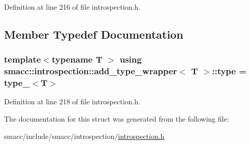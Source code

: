 Definition at line 216 of file introspection.\+h.



\subsection{Member Typedef Documentation}
\subsubsection[{\texorpdfstring{type}{type}}]{\setlength{\rightskip}{0pt plus 5cm}template$<$typename T $>$ using {\bf smacc\+::introspection\+::add\+\_\+type\+\_\+wrapper}$<$ T $>$\+::{\bf type} =  {\bf type\+\_\+}$<$T$>$}\hypertarget{structsmacc_1_1introspection_1_1add__type__wrapper_a4390a0426686e1e115d4c3ad22165cd9}{}\label{structsmacc_1_1introspection_1_1add__type__wrapper_a4390a0426686e1e115d4c3ad22165cd9}


Definition at line 218 of file introspection.\+h.



The documentation for this struct was generated from the following file\+:\begin{DoxyCompactItemize}
\item 
smacc/include/smacc/introspection/\hyperlink{introspection_8h}{introspection.\+h}\end{DoxyCompactItemize}
